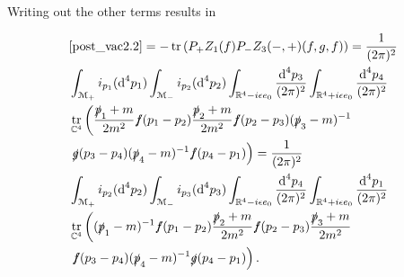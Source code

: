 \documentclass[oneside,reqno,12pt]{amsart}
\DeclareMathOperator{\tr}{tr}
\begin{document}
Writing out the other terms results in 

\begin{align*}
&\eqref{post_vac2.2}=- \tr\left(P_+ Z_1(f)P_- Z_3(-,+)(f,g,f)\right)=\frac{1}{(2\pi)^2}\\
&\int_{\mathcal{M_+}}  i_{p_1}(\text{d}^4p_{1}) 
\int_{\mathcal{M_-}}  i_{p_2}(\text{d}^4p_{2})
\int_{\mathbb{R}^4-i \epsilon e_0}\frac{\text{d}^4p_3}{(2\pi)^{2}}
\int_{\mathbb{R}^4+i \epsilon e_0}\frac{\text{d}^4p_4}{(2\pi)^{2}}
 \\
&\tr_{\mathbb{C}^4}\left(\frac{\slashed{p}_1+m}{2m^2} \slashed{f}(p_{1}-p_{2})
  \frac{\slashed{p}_{2}+m}{2m^2} 
   \slashed{f}(p_{2}-p_3)  (\slashed{p}_3-m)^{-1} \right.
\\
&\left. \slashed{g}(p_{3}-p_4)  (\slashed{p}_4-m)^{-1} \slashed{f}(p_{4}-p_{1})\right)=\frac{1}{(2\pi)^2}\\
&\int_{\mathcal{M_+}}  i_{p_2}(\text{d}^4p_{2}) 
\int_{\mathcal{M_-}}  i_{p_3}(\text{d}^4p_{3})
\int_{\mathbb{R}^4-i \epsilon e_0}\frac{\text{d}^4p_4}{(2\pi)^{2}}
\int_{\mathbb{R}^4+i \epsilon e_0}\frac{\text{d}^4p_1}{(2\pi)^{2}}
 \\
&\tr_{\mathbb{C}^4}\left( (\slashed{p}_1-m)^{-1} \slashed{f}(p_{1}-p_{2})\frac{\slashed{p}_2+m}{2m^2} \slashed{f}(p_{2}-p_{3})
 \frac{\slashed{p}_{3}+m}{2m^2} \right.\\
&\left. \slashed{f}(p_{3}-p_4)  (\slashed{p}_4-m)^{-1} \slashed{g}(p_{4}-p_1)  \right)
.\end{align*}
\end{document}
